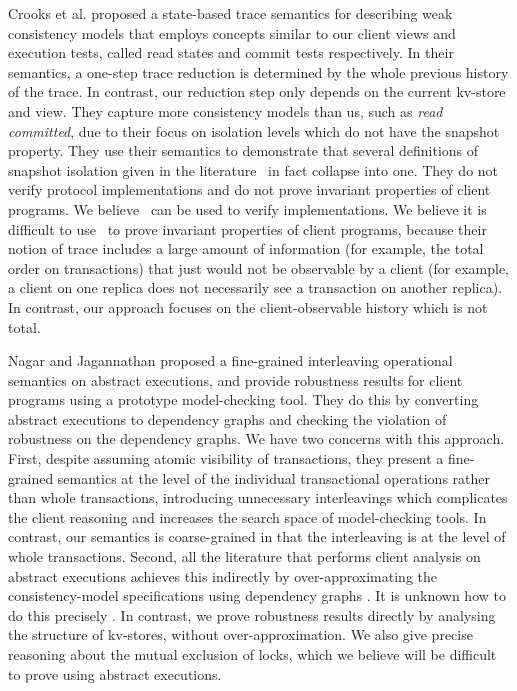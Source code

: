 {Crooks et al. \citet{seebelieve} proposed a state-based trace
semantics for describing weak consistency models that employs concepts
similar to our client views and execution tests, called read states and
commit tests respectively.  In their semantics, a one-step trace
reduction is determined by the whole previous history of the trace.
In contrast, our reduction step only depends on the current kv-store
and view.  They capture more consistency models than us, 
such as \emph{read committed}, due to their focus on isolation levels which do not
have the snapshot property. They use their semantics to demonstrate that 
several definitions of snapshot isolation  given in the
literature~\cite{si,lazy-si,geo-si} in fact collapse into one.  They do not verify
protocol implementations and do not prove invariant properties of
client programs.  We believe~\cite{seebelieve} can be used to verify
implementations. We believe it is difficult to use~\cite{seebelieve}
to prove invariant properties of client programs, because their notion of
trace includes a large amount of information (for example, the total
order on transactions) that just would not be observable by a
client (for example, a client on one replica does not necessarily see
a transaction on another replica).
In contrast, our approach focuses on the client-observable history
which is not total. 

Nagar and Jagannathan \cite{sureshConcur} proposed a fine-grained 
interleaving operational semantics on abstract executions, and provide
robustness results for client programs using 
a prototype model-checking tool. 
They do this by converting abstract executions to
dependency graphs and checking the violation of robustness on the
dependency graphs. We have two concerns with this approach.  First, despite 
assuming atomic visibility of transactions, they present a fine-grained
semantics at the level of the individual transactional operations
rather than whole transactions, introducing unnecessary interleavings
which complicates the client reasoning and increases  the
search space of model-checking tools. 
In contrast, our semantics is coarse-grained in that the  interleaving is at the level of whole
transactions. 
Second, all the literature that performs client analysis
on abstract executions achieves this indirectly by over-approximating
the consistency-model specifications using dependency graphs
\cite{giovanni_concur16,SIanalysis,psi-chopping,laws,sureshConcur}. 
It is  unknown how to do this precisely \cite{laws}. 
In contrast, we prove robustness results directly by
analysing the structure of kv-stores, without over-approximation. 
We also give precise reasoning about the mutual exclusion of locks,
which we believe will be difficult to prove using abstract executions.

}
